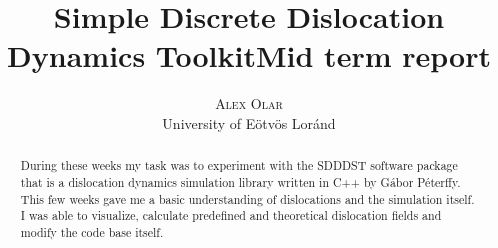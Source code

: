 \documentclass[12pt,a4paper]{article}
\title{Simple Discrete Dislocation Dynamics Toolkit\newline\textbf{Mid term report}}
\author{\Large{\textsc{Alex Olar}} \vspace{10pt}\\
	\textrm{University of Eötvös Loránd}
	}
\date{}
\theoremstyle{plain}
\begin{document}
\maketitle

\newpage

\tableofcontents

\vfill

\begin{abstract}
	During these weeks my task was to experiment with the
	SDDDST software package \cite{sdddst} that is a dislocation dynamics
	simulation library written in C++ by Gábor Péterffy. This
	few weeks gave me a basic understanding of dislocations and the
	simulation itself. I was able to visualize, calculate predefined and
	theoretical dislocation fields and modify the code base itself.
\end{abstract}

\newpage
\end{document}
